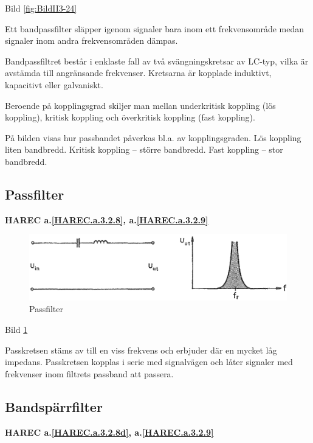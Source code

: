Bild \ref{fig:BildII3-24}

Ett bandpassfilter släpper igenom signaler bara inom ett frekvensområde medan
signaler inom andra frekvensområden dämpas.

Bandpassfiltret består i enklaste fall av två svängningskretsar av LC-typ, vilka
är avstämda till angränsande frekvenser. Kretsarna är kopplade induktivt,
kapacitivt eller galvaniskt.

Beroende på kopplingsgrad skiljer man mellan underkritisk koppling (lös
koppling), kritisk koppling och överkritisk koppling (fast koppling).

På bilden visas hur passbandet påverkas bl.a. av kopplingsgraden. Lös koppling
liten bandbredd. Kritisk koppling -- större bandbredd. Fast koppling -- stor
bandbredd.

\subsection{Passfilter}
\textbf{HAREC
  a.\ref{HAREC.a.3.2.8}\label{myHAREC.a.3.2.8},
  a.\ref{HAREC.a.3.2.9}\label{myHAREC.a.3.2.9d}
}

\begin{figure}
\includegraphics[width=\textwidth]{images/bild_2_3-25.png}
\caption{Passfilter}
\label{fig:BildII3-25}
\end{figure}

Bild \ref{fig:BildII3-25}

Passkretsen stäms av till en viss frekvens och erbjuder där en mycket låg
impedans. Passkretsen kopplas i serie med signalvägen och låter signaler med
frekvenser inom filtrets passband att passera.

\subsection{Bandspärrfilter}
\textbf{HAREC
  a.\ref{HAREC.a.3.2.8d}\label{myHAREC.a.3.2.8d},
  a.\ref{HAREC.a.3.2.9}\label{myHAREC.a.3.2.9e}
}

